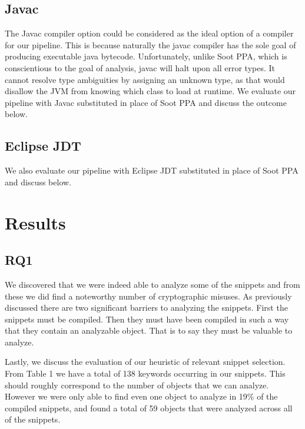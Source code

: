 \documentclass[10pt, conference]{IEEEtran}
\begin{document}
\subsection{Javac}

The Javac compiler option could be considered as the ideal option of a compiler for our pipeline. This is because naturally the javac compiler has the sole goal of producing executable java bytecode. Unfortunately, unlike Soot PPA, which is conscientious to the goal of analysis, javac will halt upon all error types. It cannot resolve type ambiguities by assigning an unknown type, as that would disallow the JVM from knowing which class to load at runtime. We evaluate our pipeline with Javac substituted in place of Soot PPA and discuss the outcome below.

\subsection{Eclipse JDT}

We also evaluate our pipeline with Eclipse JDT substituted in place of Soot PPA and discuss below.

\section{Results}

\subsection{RQ1}

We discovered that we were indeed able to analyze some of the snippets and from these we did find a noteworthy number of cryptographic misuses. As previously discussed there are two significant barriers to analyzing the snippets. First the snippets must be compiled. Then they must have been compiled in such a way that they contain an analyzable object. That is to say they must be valuable to analyze. 

Lastly, we discuss the evaluation of our heuristic of relevant snippet selection. From Table 1 we have a total of 138 keywords occurring in our snippets. This should roughly correspond to the number of objects that we can analyze. However we were only able to find even one object to analyze in 19\% of the compiled snippets, and found a total of 59 objects that were analyzed across all of the snippets. 
\end{document}
